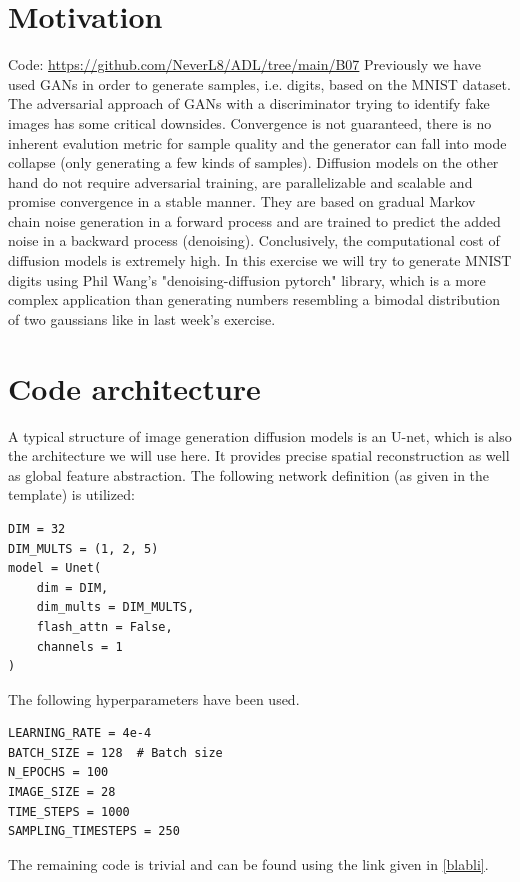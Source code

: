 \chapter{Motivation}\label{blabli}
Code: \url{https://github.com/NeverL8/ADL/tree/main/B07}
\vspace{0.75cm}\newline
Previously we have used GANs in order to generate samples, i.e. digits, based on the MNIST dataset. The adversarial approach of GANs with
a discriminator trying to identify fake images has some critical downsides. Convergence is not guaranteed, there is no inherent evalution metric
for sample quality and the generator can fall into mode collapse (only generating a few kinds of samples).
Diffusion models on the other hand do not require adversarial training, are parallelizable and scalable and promise convergence in a stable manner.
They are based on gradual Markov chain noise generation in a forward process and are trained to predict the
added noise in a backward process (denoising).
Conclusively, the computational cost of diffusion models is extremely high.
In this exercise we will try to generate MNIST digits using Phil Wang's "denoising-diffusion pytorch"\cite{lucidrains_denoising_diffusion_pytorch}
library, which is a more complex application than generating numbers
resembling a bimodal distribution of two gaussians like in last week's exercise.
\chapter{Code architecture}
A typical structure of image generation diffusion models is an U-net, which
is also the architecture we will use here. It provides precise spatial reconstruction as well as global feature abstraction.
The following network definition (as given in the template) is utilized:
\begin{verbatim}
DIM = 32
DIM_MULTS = (1, 2, 5)
model = Unet(
    dim = DIM,
    dim_mults = DIM_MULTS,
    flash_attn = False,
    channels = 1
)
\end{verbatim}
The following hyperparameters have been used.
\begin{verbatim}
LEARNING_RATE = 4e-4
BATCH_SIZE = 128  # Batch size
N_EPOCHS = 100
IMAGE_SIZE = 28
TIME_STEPS = 1000
SAMPLING_TIMESTEPS = 250
\end{verbatim}
The remaining code is trivial and can be found using the link given in \autoref{blabli}.
